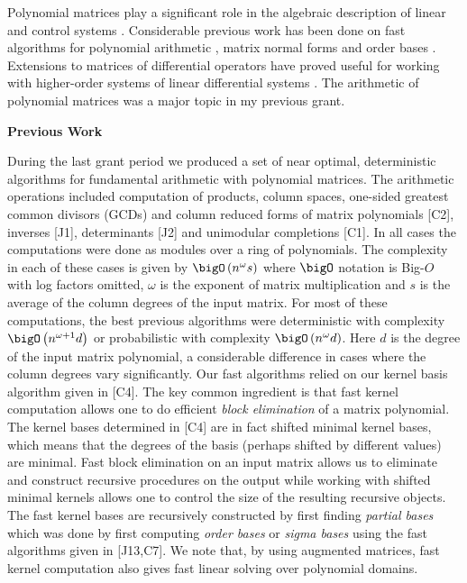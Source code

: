 
Polynomial matrices play a significant role in the algebraic description of linear and control systems \cite{kaczorek,kailath}. Considerable previous work has been done on fast algorithms for polynomial arithmetic \cite{giorgi}, matrix normal forms \cite{villard,gupta} and order bases \cite{giorgi2}. Extensions to matrices of differential operators have proved useful for working with higher-order systems of linear differential systems \cite{barkatou,barkatou2}. The arithmetic of polynomial matrices was a major topic in my previous grant.

\bigskip
\noindent
{\bf Previous Work}
\bigskip

During the last grant period we produced a set of near optimal, deterministic algorithms for fundamental arithmetic with polynomial matrices. The arithmetic operations included computation of products, column spaces, one-sided greatest common divisors (GCDs) and column reduced forms of matrix polynomials [C2], inverses [J1], determinants  [J2] and unimodular completions [C1]. In all cases the computations were done as modules over a ring of polynomials. The complexity in each of these cases is given by $\bigO\left(n^{\omega}s\right) $ where $\bigO$ notation is Big-$O$ with log factors omitted, $\omega$ is the exponent of matrix multiplication and $s$ is the average of the column degrees of the input matrix.  For most of these computations, the best previous algorithms were deterministic with  complexity $\bigO\left(n^{\omega + 1}d \right)$ or probabilistic with complexity $\bigO\left(n^{\omega}d \right)$. Here $d$ is the degree of the input matrix polynomial, a considerable difference in cases where the column degrees vary significantly. Our fast algorithms relied on our kernel basis algorithm given in [C4]. The key common ingredient is that fast kernel computation allows one to do efficient  {\em block elimination} of a matrix polynomial. The kernel bases determined in [C4] are in fact shifted minimal kernel bases, which means that the degrees of the basis (perhaps shifted by different values) are minimal. Fast block elimination on an input matrix allows us to eliminate and construct recursive procedures on the output while working with shifted minimal kernels allows one to control the size of the resulting recursive objects.   The fast kernel bases are recursively constructed by first finding {\em partial bases} which was done by first computing {\em order bases} or {\em sigma bases} \cite{bela1994} using the fast algorithms given in [J13,C7]. 
We note that, by using augmented matrices, fast kernel computation also gives fast linear solving over polynomial domains.

